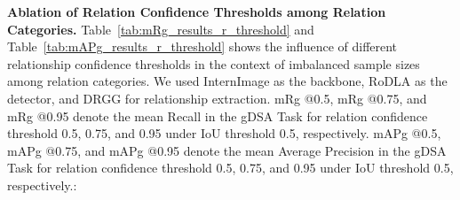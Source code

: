 {\noindent \textbf{Ablation of Relation Confidence Thresholds among Relation Categories.}}
{Table~\ref{tab:mRg_results_r_threshold} and Table~\ref{tab:mAPg_results_r_threshold} shows the influence of different relationship confidence thresholds in the context of imbalanced sample sizes among relation categories. We used InternImage as the backbone, RoDLA as the detector, and DRGG for relationship extraction. mRg @0.5, mRg @0.75, and mRg @0.95 denote the mean Recall in the gDSA Task for relation confidence threshold 0.5, 0.75, and 0.95 under IoU threshold 0.5, respectively. mAPg @0.5, mAPg @0.75, and mAPg @0.95 denote the mean Average Precision in the gDSA Task for relation confidence threshold 0.5, 0.75, and 0.95 under IoU threshold 0.5, respectively.}:
\begin{table}[ht]
\centering
\caption{{mR$_g$ Results at different relation confidence thresholds.}}
\renewcommand{\arraystretch}{1.2}
\label{tab:mRg_results_r_threshold}
\end{table}

